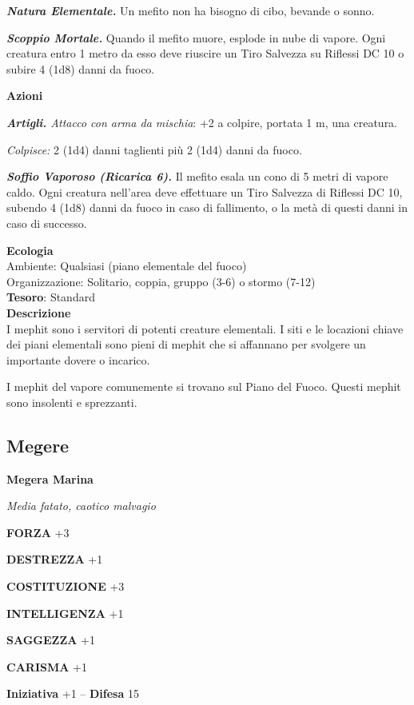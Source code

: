\begin{multicols}{2}
\textit{\textbf{Natura Elementale.}} Un mefito non ha bisogno di cibo, bevande o sonno.

\textit{\textbf{Scoppio Mortale.}} Quando il mefito muore, esplode in nube di vapore. Ogni creatura entro 1 metro da esso deve riuscire un Tiro Salvezza su Riflessi DC 10 o subire 4 (1d8) danni da fuoco.

\textbf{Azioni}

\textit{\textbf{Artigli.} Attacco con arma da mischia}: +2 a colpire, portata 1 m, una creatura.

\textit{Colpisce:} 2 (1d4) danni taglienti più 2 (1d4) danni da fuoco.

\textit{\textbf{Soffio Vaporoso (Ricarica 6).}} Il mefito esala un cono di 5 metri di vapore caldo. Ogni creatura nell'area deve effettuare un Tiro Salvezza di Riflessi DC 10, subendo 4 (1d8) danni da fuoco in caso di fallimento, o la metà di questi danni in caso di successo.

\textbf{Ecologia}\\
Ambiente: Qualsiasi (piano elementale del fuoco)\\
Organizzazione: Solitario, coppia, gruppo (3-6) o stormo (7-12)\\
\textbf{Tesoro}: Standard\\
\textbf{Descrizione}\\
I mephit sono i servitori di potenti creature elementali. I siti e le locazioni chiave dei piani elementali sono pieni di mephit che si affannano per svolgere un importante dovere o incarico.

I mephit del vapore comunemente si trovano sul Piano del Fuoco. Questi mephit sono insolenti e sprezzanti.



\subsection{Megere}

\medskip{}\textbf{Megera Marina}

\textit{Media fatato, caotico malvagio}

\textbf{FORZA} +3

\textbf{DESTREZZA} +1

\textbf{COSTITUZIONE} +3

\textbf{INTELLIGENZA} +1

\textbf{SAGGEZZA} +1

\textbf{CARISMA} +1

\textbf{Iniziativa} +1 -- \textbf{Difesa} 15


\end{multicols}
